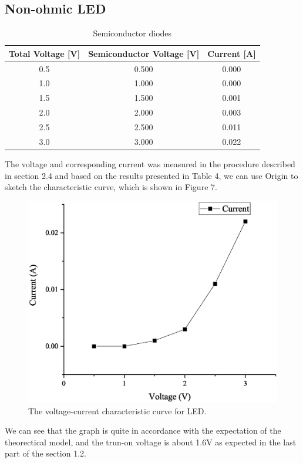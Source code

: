 \documentclass[a4paper]{report}
\begin{document}
	\subsection{Non-ohmic LED}
	\begin{table}[H]
		\centering
		\begin{tabular}{|c|c|c|}
			\hline
			Total Voltage [V]&Semiconductor Voltage [V]&Current [A]\\
			\hline
			0.5&0.500&0.000\\
			\hline
			1.0&1.000&0.000\\
			\hline
			1.5&1.500&0.001\\
			\hline
			2.0&2.000&0.003\\
			\hline
			2.5&2.500&0.011\\
			\hline
			3.0&3.000&0.022\\
			\hline
		\end{tabular}
		\caption{Semiconductor diodes}
	\end{table}
	The voltage and corresponding current was measured in the procedure described in section 2.4 and based on the results presented in Table 4, we can use Origin to sketch the characteristic curve, which is shown in Figure 7.
	\begin{figure}[H]
		\centering
		\includegraphics[width=1\linewidth]{7.eps}
		\caption{The voltage-current characteristic curve for LED.}
	\end{figure}
	We can see that the graph is quite in accordance with the expectation of the theorectical model, and the trun-on voltage is about 1.6V as expected in the last part of the section 1.2.
\end{document}
